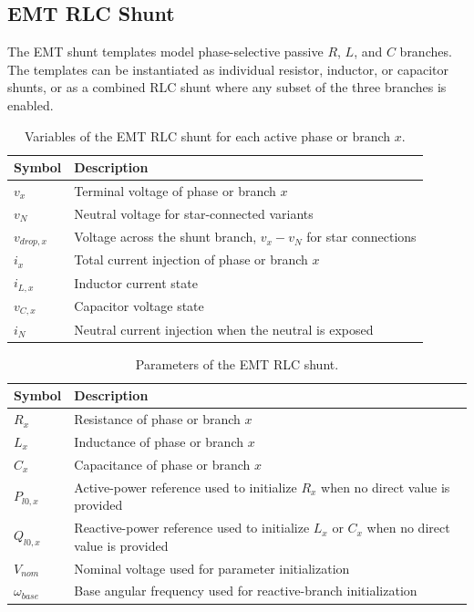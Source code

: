 \subsection{EMT RLC Shunt}

The EMT shunt templates model phase-selective passive $R$, $L$, and $C$ branches. The templates can be instantiated as individual resistor, inductor, or capacitor shunts, or as a combined RLC shunt where any subset of the three branches is enabled.

\begin{table}[H]
    \centering
    \caption{Variables of the EMT RLC shunt for each active phase or branch $x$.}
    \begin{tabular}{ll}
        \toprule
        Symbol & Description \\
        \midrule
        $v_x$ & Terminal voltage of phase or branch $x$ \\
        $v_N$ & Neutral voltage for star-connected variants \\
        $v_{drop,x}$ & Voltage across the shunt branch, $v_x-v_N$ for star connections \\
        $i_x$ & Total current injection of phase or branch $x$ \\
        $i_{L,x}$ & Inductor current state \\
        $v_{C,x}$ & Capacitor voltage state \\
        $i_N$ & Neutral current injection when the neutral is exposed \\
        \bottomrule
    \end{tabular}
\end{table}

\begin{table}[H]
    \centering
    \caption{Parameters of the EMT RLC shunt.}
    \begin{tabular}{ll}
        \toprule
        Symbol & Description \\
        \midrule
        $R_x$ & Resistance of phase or branch $x$ \\
        $L_x$ & Inductance of phase or branch $x$ \\
        $C_x$ & Capacitance of phase or branch $x$ \\
        $P_{l0,x}$ & Active-power reference used to initialize $R_x$ when no direct value is provided \\
        $Q_{l0,x}$ & Reactive-power reference used to initialize $L_x$ or $C_x$ when no direct value is provided \\
        $V_{nom}$ & Nominal voltage used for parameter initialization \\
        $\omega_{base}$ & Base angular frequency used for reactive-branch initialization \\
        \bottomrule
    \end{tabular}
\end{table}

